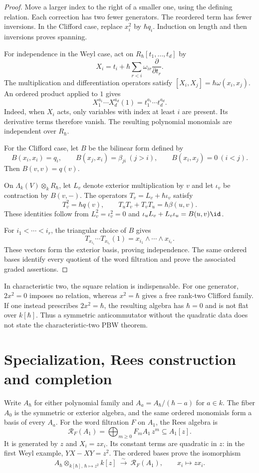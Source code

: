 \begin{proof}
Move a larger index to the right of a smaller one, using the defining relation.
Each correction has two fewer generators.
The reordered term has fewer inversions.
In the Clifford case, replace $x_i^2$ by $\hbar q_i$.
Induction on length and then inversions proves spanning.

For independence in the Weyl case, act on $R_\hbar[t_1,\ldots,t_d]$ by
\[
 X_i=t_i+\hbar\sum_{r<i}\omega_{ir}\frac{\partial}{\partial t_r}.
\]
The multiplication and differentiation operators satisfy
$[X_i,X_j]=\hbar\omega(x_i,x_j)$.
An ordered product applied to $1$ gives
\[
 X_1^{a_1}\cdots X_d^{a_d}(1)=t_1^{a_1}\cdots t_d^{a_d}.
\]
Indeed, when $X_i$ acts, only variables with index at least $i$ are present.
Its derivative terms therefore vanish.
The resulting polynomial monomials are independent over $R_\hbar$.

For the Clifford case, let $B$ be the bilinear form defined by
\[
 B(x_i,x_i)=q_i,\qquad B(x_j,x_i)=\beta_{ji}\ (j>i),\qquad
 B(x_i,x_j)=0\ (i<j).
\]
Then $B(v,v)=q(v)$.

On $\Lambda_k(V)\otimes_k R_\hbar$, let $L_v$ denote exterior multiplication by $v$ and let $\iota_v$ be contraction by $B(v,-)$.
The operators $T_v=L_v+\hbar\iota_v$ satisfy
\[
 T_v^2=\hbar q(v),\qquad T_uT_v+T_vT_u=\hbar\beta(u,v).
\]
These identities follow from $L_v^2=\iota_v^2=0$ and
$\iota_uL_v+L_v\iota_u=B(u,v)\id$.

For $i_1<\cdots<i_r$, the triangular choice of $B$ gives
\[
 T_{x_{i_1}}\cdots T_{x_{i_r}}(1)
       =x_{i_1}\wedge\cdots\wedge x_{i_r}.
\]
These vectors form the exterior basis, proving independence.
The same ordered bases identify every quotient of the word filtration and prove the associated graded assertions.
\end{proof}

In characteristic two, the square relation is indispensable.
For one generator, $2x^2=0$ imposes no relation, whereas $x^2=\hbar$ gives a free rank-two Clifford family.
If one instead prescribes $2x^2=\hbar$, the resulting algebra has $\hbar=0$ and is not flat over $k[\hbar]$.
Thus a symmetric anticommutator without the quadratic data does not state the characteristic-two PBW theorem.

\section{Specialization, Rees construction and completion}
Write $A_\hbar$ for either polynomial family and $A_a=A_\hbar/(\hbar-a)$ for $a\in k$.
The fiber $A_0$ is the symmetric or exterior algebra, and the same ordered monomials form a basis of every $A_a$.
For the word filtration $F$ on $A_1$, the Rees algebra is
\[
 \mathcal R_F(A_1)=\bigoplus_{m\geq0}F_mA_1\,z^m\subseteq A_1[z].
\]
It is generated by $z$ and $X_i=zx_i$.
Its constant terms are quadratic in $z$: in the first Weyl example,
$YX-XY=z^2$.
The ordered bases prove the isomorphism
\[
 A_\hbar\otimes_{k[\hbar],\,\hbar\mapsto z^2}k[z]
       \ \xrightarrow{\ \sim\ }\ \mathcal R_F(A_1),
 \qquad x_i\longmapsto zx_i.
\]

